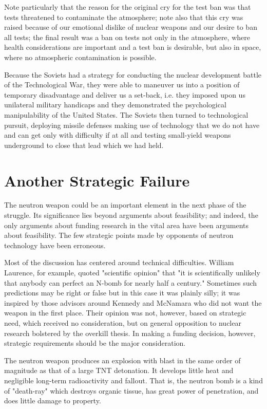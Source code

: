 Note particularly that the reason for the original cry for the test ban was that tests threatened to contaminate the atmosphere; note also that this cry was raised because of our emotional dislike of nuclear weapons and our desire to ban all tests; the final result was a ban on tests not only in the atmosphere, where health considerations are important and a test ban is desirable, but also in space, where no atmospheric contamination is possible.

Because the Soviets had a strategy for conducting the nuclear development battle of the Technological War, they were able to maneuver us into a position of temporary disadvantage and deliver us a set-back, i.e. they imposed upon us unilateral military handicaps and they demonstrated the psychological manipulability of the United States. The Soviets then turned to technological pursuit, deploying missile defenses making use of technology that we do not have and can get only with difficulty if at all and testing small-yield weapons underground to close that lead which we had held.

\section{Another Strategic Failure}
The neutron weapon could be an important element in the next phase of the struggle. Its significance lies beyond arguments about feasibility; and indeed, the only arguments about funding research in the vital area have been arguments about feasibility. The few strategic points made by opponents of neutron technology have been erroneous.

Most of the discussion has centered around technical difficulties. William Laurence, for example, quoted "scientific opinion" that "it is scientifically unlikely that anybody can perfect an N-bomb for nearly half a century." Sometimes such predictions may be right or false but in this case it was plainly silly; it was inspired by those advisors around Kennedy and McNamara who did not want the weapon in the first place. Their opinion was not, however, based on strategic need, which received no consideration, but on general opposition to nuclear research bolstered by the overkill thesis. In making a funding decision, however, strategic requirements should be the major consideration.

The neutron weapon produces an explosion with blast in the same order of magnitude as that of a large TNT detonation. It develops little heat and negligible long-term radioactivity and fallout. That is, the neutron bomb is a kind of "death-ray" which destroys organic tissue, has great power of penetration, and does little damage to property.

